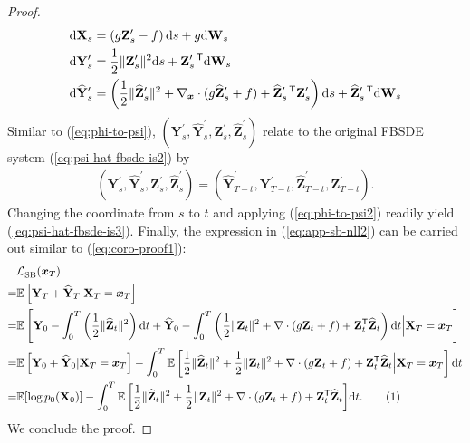 \documentclass{article}
\def\eqref#1{(\ref{#1})}
\def\rd{{\textnormal{d}}}
\def\rvX{{\mathbf{X}}}
\def\rvY{{\mathbf{Y}}}
\def\rvZ{{\mathbf{Z}}}
\def\vx{{\bm{x}}}
\newcommand{\E}{\mathbb{E}}
\def\ws{{ \mathbf{W}_s }}
\def\dws{{ \mathrm{d} \ws }}
\newcommand{\norm}[1]{\lVert#1\rVert}
\def\dt{{ \mathrm{d} t }}
\def\ds{{ \mathrm{d} s }}
\newcommand{\br}[1]{\left[#1\right]}
\newcommand{\pr}[1]{\left(#1\right)}
\newcommand{\T}{\mathsf{T}}
\newcommand\numberthis{\addtocounter{equation}{1}\tag{\theequation}}
\begin{document}
\begin{proof}
  \begin{subequations}
  \begin{align}
      \rd \rvX_s &= \pr{g \rvZ^\prime_s - f} \ds + g \dws  \\
      \rd {\rvY}^\prime_s &= \frac{1}{2} \norm{\rvZ^\prime_s}^2 \ds + \rvZ_s^{\prime~\T} \dws  \\
      \rd \widehat{\rvY}^\prime_s &= \pr{\frac{1}{2} \norm{\widehat{\rvZ}^\prime_s}^2 + \nabla_\vx \cdot (g\widehat{\rvZ}^\prime_s +f) + \widehat{\rvZ}_s^{\prime~\T}\rvZ^\prime_s } \ds + \widehat{\rvZ}_s^{\prime~\T} \dws
  \end{align}
  \end{subequations}
  Similar to \eqref{eq:phi-to-psi}, $({\rvY}^\prime_s, \widehat{\rvY}^\prime_s, \rvZ^\prime_s, \widehat{\rvZ}^\prime_s)$ relate to the original FBSDE system \eqref{eq:psi-hat-fbsde-is2} by
  \begin{align}
    ({\rvY}^\prime_s, \widehat{\rvY}^\prime_s, \rvZ^\prime_s, \widehat{\rvZ}^\prime_s)
    = (\widehat{\rvY}^\prime_{T-t}, {\rvY}^\prime_{T-t}, \widehat{\rvZ}^\prime_{T-t}, \rvZ^\prime_{T-t}).
    \label{eq:phi-to-psi2}
  \end{align}
  Changing the coordinate from $s$ to $t$ and applying \eqref{eq:phi-to-psi2} readily
  yield \eqref{eq:psi-hat-fbsde-is3}.
  Finally, the expression in \eqref{eq:app-sb-nll2} can be carried out similar to \eqref{eq:coro-proof1}:
    \begin{align*}
        &\LSB(\vx_T) \\
        =& \E \br{\rvY_T + \widehat{\rvY}_T | \rvX_T=\vx_T} \\
        =& \E\br{{\rvY}_0 - \int_0^T \pr{\frac{1}{2} \norm{\widehat{\rvZ}_t}^2}\dt +
         \widehat{\rvY}_0 - \int_0^T \pr{\frac{1}{2} \norm{{\rvZ}_t}^2 + \nabla \cdot (g{\rvZ}_t +f) + {\rvZ}_t^\T\widehat{\rvZ}_t } \dt \Big| \rvX_T=\vx_T} \\
        =& \E \br{\rvY_0 + \widehat{\rvY}_0 | \rvX_T=\vx_T}
         - \int_0^T \E\br{ \frac{1}{2} \norm{\widehat{\rvZ}_t}^2 + \frac{1}{2} \norm{{\rvZ}_t}^2 + \nabla \cdot (g{\rvZ}_t +f) + {\rvZ}_t^\T\widehat{\rvZ}_t \Big| \rvX_T=\vx_T} \dt  \\
        =& \E [\log p_0(\rvX_0)]
         - \int_0^T {\E\br{ \frac{1}{2} \norm{\widehat{\rvZ}_t}^2 + \frac{1}{2} \norm{{\rvZ}_t}^2 + \nabla \cdot (g{\rvZ}_t +f) + {\rvZ}_t^\T\widehat{\rvZ}_t}} \dt. \numberthis \label{eq:coro-proof2}
    \end{align*}
  We conclude the proof.
\end{proof}
\end{document}

